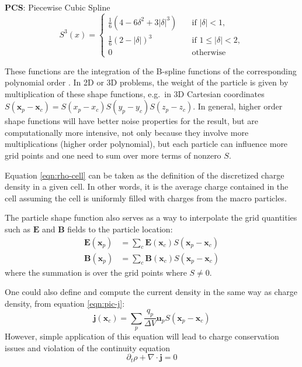 \textbf{PCS}: Piecewise Cubic Spline
\begin{equation}
  \label{eq:third-order-deposit}
  S^3(x) =
  \begin{cases}
    \displaystyle \frac{1}{6} \left( 4 - 6\delta^2 + 3|\delta|^3 \right) & \quad \text{if } |\delta| < 1, \\
    \displaystyle \frac{1}{6} \left( 2 - |\delta| \right)^3 & \quad \text{if } 1 \leq |\delta| < 2, \\
    \displaystyle 0                      & \quad \text{otherwise}
  \end{cases}
\end{equation}

These functions are the integration of the B-spline functions of the
corresponding polynomial order \citep{haugboelle_photon-plasma:_2012}.
In 2D or 3D problems, the weight of the particle is given by multiplication of
these shape functions, e.g.\ in 3D Cartesian coordinates $S(\mathbf{x}_{p} -
\mathbf{x}_{c}) = S(x_{p} - x_{c})S(y_{p} - y_{c})S(z_{p} - z_{c})$. In general,
higher order shape functions will have better noise properties for the result,
but are computationally more intensive, not only because they involve more
multiplications (higher order polynomial), but each particle can influence more
grid points and one need to sum over more terms of nonzero $S$.

Equation \eqref{eqn:rho-cell} can be taken as the definition of the discretized
charge density in a given cell. In other words, it is the average charge
contained in the cell assuming the cell is uniformly filled with charges from
the macro particles.

The particle shape function also serves as a way to interpolate the grid
quantities such as $\mathbf{E}$ and $\mathbf{B}$ fields to the particle
location:
\begin{align}
    \label{eqn:interpolate}
    \mathbf{E}(\mathbf{x}_p) &= \sum_c \mathbf{E}(\mathbf{x}_c) S(\mathbf{x}_p - \mathbf{x}_c) \\
    \mathbf{B}(\mathbf{x}_p) &= \sum_c \mathbf{B}(\mathbf{x}_c) S(\mathbf{x}_p - \mathbf{x}_c)
\end{align}
where the summation is over the grid points where $S \neq 0$.

One could also define and compute the current density in the same way as charge density,
from equation \eqref{eqn:pic-j}:
\begin{equation}
  \label{eq:naive-j}
  \mathbf{j} ( \mathbf{x}_{c} ) = \sum_{p} \frac{q_{p}}{\Delta V}\mathbf{u}_p S (
  \mathbf{x}_{p} -\mathbf{x}_{c} )
\end{equation}
However, simple application of this equation will lead to charge
conservation issues and violation of the continuity equation \citetext{see e.g.\
  \citealp{hockney_computer_1981}, \citealp{birdsall_plasma_1991}}
\begin{equation}
    \label{eq:continuity}
    \partial_t\rho + \nabla\cdot \mathbf{j} = 0
\end{equation}

